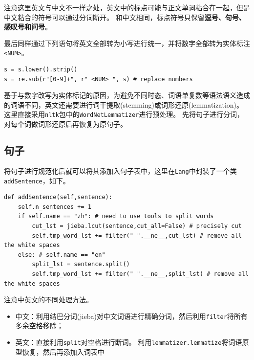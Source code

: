 \documentclass[logo,reportComp]{thesis}
\begin{document}
注意这里英文与中文不一样之处，英文中的标点可能与正文单词粘合在一起，但是中文粘合的符号可以通过分词断开。
和中文相同，标点符号只保留\textbf{逗号、句号、感叹号和问号}。

最后同样通过下列语句将英文全部转为小写进行统一，并将数字全部转为实体标注\verb'<NUM>'。
\begin{lstlisting}
s = s.lower().strip()
s = re.sub(r"[0-9]+", r" <NUM> ", s) # replace numbers
\end{lstlisting}

基于与数字改写为实体标记的原因，为避免不同时态、词语单复数等语法语义造成的词语不同，英文还需要进行词干提取(stemming)或词形还原(lemmatization)\cite{bib:stem}。
这里直接采用\verb'nltk'包中的\verb'WordNetLemmatizer'进行预处理。
先将句子进行分词，对每个词做词形还原后再恢复为原句子。

\subsection{句子}
\label{sub:sentence}
将句子进行规范化后就可以将其添加入句子表中，这里在\verb'Lang'中封装了一个类\verb'addSentence'，如下。
\begin{lstlisting}
def addSentence(self,sentence):
    self.n_sentences += 1
    if self.name == "zh": # need to use tools to split words
        cut_lst = jieba.lcut(sentence,cut_all=False) # precisely cut
        self.tmp_word_lst += filter(" ".__ne__,cut_lst) # remove all the white spaces
    else: # self.name == "en"
        split_lst = sentence.split()
        self.tmp_word_lst += filter(" ".__ne__,split_lst) # remove all the white spaces
\end{lstlisting}

注意中英文的不同处理方法。
\begin{itemize}
    \item 中文：利用结巴分词(jieba)对中文词语进行精确分词，然后利用\verb'filter'将所有多余空格移除；
    \item 英文：直接利用\verb'split'对空格进行断词。
    利用\verb'lemmatizer.lemmatize'将词语原型恢复，然后再添加入词表中
\end{itemize}
\end{document}

